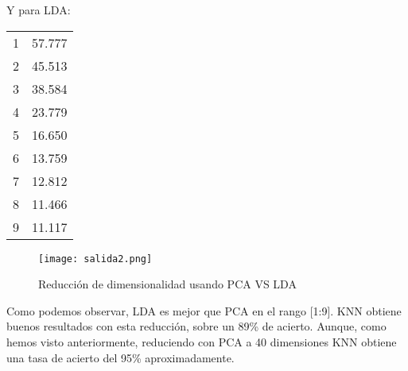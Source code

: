 \documentclass[11pt,oneside,a4paper]{article}
\begin{document}
Y para LDA: 


\begin{center}
\begin{tabular}{l c}
1 &	57.777\\
2 &	45.513\\
3 &	38.584\\
4 &	23.779\\
5 &	16.650\\
6 &	13.759\\
7 &	12.812\\
8 &	11.466\\
9 &	11.117\\
\end{tabular}
\end{center}
\begin{figure}
\texttt{[image: salida2.png]}
\caption{Reducción de dimensionalidad usando PCA VS LDA}
\end{figure}


Como podemos observar, LDA es mejor que PCA en el rango [1:9]. KNN obtiene buenos resultados con esta reducción, sobre un 89\% de acierto. Aunque, como hemos visto anteriormente, reduciendo con PCA a 40 dimensiones KNN obtiene una tasa de acierto del 95\% aproximadamente.
\end{document}
